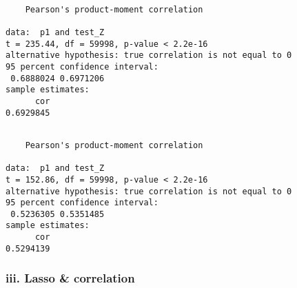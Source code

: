 \documentclass[11pt]{article}
\begin{document}
    
    \begin{verbatim}

	Pearson's product-moment correlation

data:  p1 and test_Z
t = 235.44, df = 59998, p-value < 2.2e-16
alternative hypothesis: true correlation is not equal to 0
95 percent confidence interval:
 0.6888024 0.6971206
sample estimates:
      cor 
0.6929845 

    \end{verbatim}

    
    
    \begin{verbatim}

	Pearson's product-moment correlation

data:  p1 and test_Z
t = 152.86, df = 59998, p-value < 2.2e-16
alternative hypothesis: true correlation is not equal to 0
95 percent confidence interval:
 0.5236305 0.5351485
sample estimates:
      cor 
0.5294139 

    \end{verbatim}

    
    \subsubsection{iii. Lasso \& correlation}\label{iii.-lasso-correlation}
\end{document}
